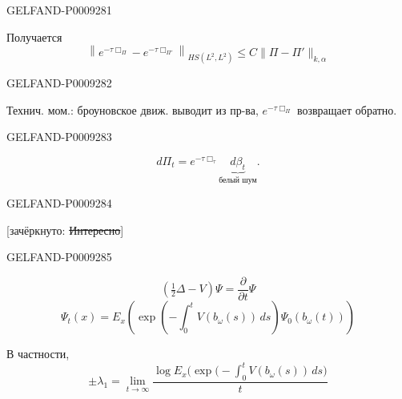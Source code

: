 \begin{GelfandAdjacentEvidence}{GELFAND-P000928}{1}

Получается
\begin{equation*}
 \left\|e^{-\tau\Box_\Pi}-e^{-\tau\Box_{\Pi'}}\right\|_{HS(L^2,L^2)}
 \le C\|\Pi-\Pi'\|_{k,\alpha}
 \tag{8}
\end{equation*}
\end{GelfandAdjacentEvidence}
\begin{GelfandAdjacentEvidence}{GELFAND-P000928}{2}


Технич. мом.: броуновское движ. выводит из пр-ва, $e^{-\tau\Box_\Pi}$ возвращает обратно.
\end{GelfandAdjacentEvidence}
\begin{GelfandAdjacentEvidence}{GELFAND-P000928}{3}

\begin{equation*}
 d\Pi_t=e^{-\tau\Box_\tau}\underbrace{d\beta_t}_{\text{белый шум}}.
 \tag{9}
\end{equation*}
\end{GelfandAdjacentEvidence}
\begin{GelfandAdjacentEvidence}{GELFAND-P000928}{4}


[зачёркнуто: \sout{Интересно}]
\end{GelfandAdjacentEvidence}
\begin{GelfandAdjacentEvidence}{GELFAND-P000928}{5}

\begin{equation*}
 \left(\tfrac12\Delta-V\right)\Psi=\frac{\partial}{\partial t}\Psi
 \tag{10}
\end{equation*}
\begin{equation*}
 \Psi_t(x)=E_x\left(\exp\left(-\int_0^t V(b_\omega(s))\,ds\right)
 \Psi_0(b_\omega(t))\right)
 \tag{11}
\end{equation*}

В частности,
\begin{equation*}
 \pm\lambda_1=\lim_{t\to\infty}
 \frac{\log E_x\bigl(\exp\bigl(-\int_0^t V(b_\omega(s))\,ds\bigr)}{t}
 \tag{12}
\end{equation*}
\end{GelfandAdjacentEvidence}
